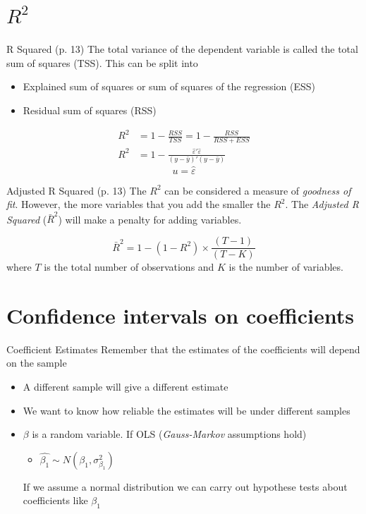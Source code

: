 \documentclass[14pt,xcolor=pdftex,dvipsnames,table]{beamer}\usepackage[]{graphicx}\usepackage[]{color}
\begin{document}
\section{$R^2$}
\begin{frame}{R Squared (p. 13)}
The total variance of the dependent variable is called the total sum of squares (TSS).  This can be split into 
\begin{itemize}[<+-| alert@+>]
\item Explained sum of squares or sum of squares of the regression (ESS)
\item Residual sum of squares (RSS)
\end{itemize}
\pause
\begin{align*}
R^2 &= 1 - \frac{RSS}{TSS} = 1 - \frac{RSS}{RSS + ESS}\\
R^2 &= 1 - \frac{\hat{\varepsilon}'\hat{\varepsilon}}{(y - \bar{y})'(y - \bar{y})}
\end{align*}
\begin{equation}
u = \hat{\varepsilon}
\end{equation}
\end{frame}

\begin{frame}{Adjusted R Squared (p. 13)}
The $R^2$ can be considered a measure of \emph{goodness of fit}.  However, the more variables that you add the smaller the $R^2$. The \emph{Adjusted R Squared} ($\bar{R}^2$) will make a penalty for adding variables. 

\begin{equation}
\bar{R}^2 = 1 - (1 - R^2) \times \frac{(T - 1)}{(T - K)}
\end{equation}
where $T$ is the total number of observations and $K$ is the number of variables. 
\end{frame}


\section{Confidence intervals on coefficients}
\begin{frame}{Coefficient Estimates}
Remember that the estimates of the coefficients will depend on the sample
\begin{itemize}[<+-| alert@+>]
\item A different sample will give a different estimate
\item We want to know how reliable the estimates will be under different samples
\item $\beta$ is a random variable.  If OLS (\emph{Gauss-Markov} assumptions hold)
\begin{itemize}
\item $\hat{\beta_1} \sim N (\beta_1, \sigma_{\beta_1}^2)$
\end{itemize}
\pause
If we assume a normal distribution we can carry out hypothese tests about coefficients like $\beta_1$
\end{itemize}
\end{frame}
\end{document}
